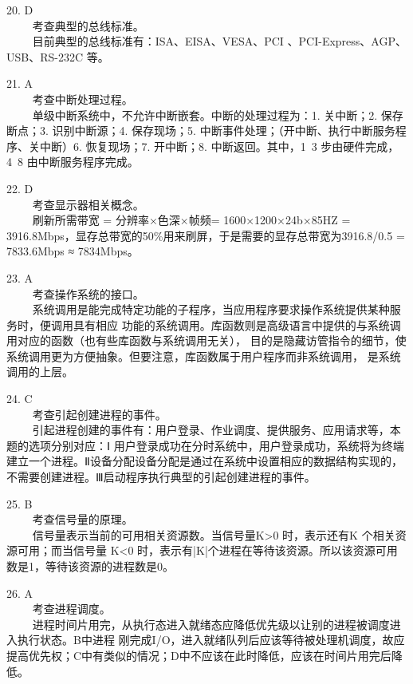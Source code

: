 20. D \\
$\qquad$ 考查典型的总线标准。 \\
$\qquad$ 目前典型的总线标准有：ISA、EISA、VESA、PCI 、PCI-Express、AGP、USB、RS-232C 等。

21. A \\
$\qquad$ 考查中断处理过程。\\
$\qquad$ 单级中断系统中，不允许中断嵌套。中断的处理过程为：1. 关中断；2. 保存断点；3. 识别中断源；4. 保存现场；5. 中断事件处理；（开中断、执行中断服务程序、关中断）6. 恢复现场；7. 开中断；8. 中断返回。其中，1~3 步由硬件完成，4~8 由中断服务程序完成。

22. D \\
$\qquad$ 考查显示器相关概念。\\
$\qquad$ 刷新所需带宽 = 分辨率×色深×帧频= 1600×1200×24b×85HZ = 3916.8Mbps，显存总带宽的50\%用来刷屏，于是需要的显存总带宽为3916.8/0.5 = 7833.6Mbps ≈ 7834Mbps。

23. A \\
$\qquad$ 考查操作系统的接口。\\
$\qquad$ 系统调用是能完成特定功能的子程序，当应用程序要求操作系统提供某种服务时，便调用具有相应
功能的系统调用。库函数则是高级语言中提供的与系统调用对应的函数（也有些库函数与系统调用无关），
目的是隐藏访管指令的细节，使系统调用更为方便抽象。但要注意，库函数属于用户程序而非系统调用，
是系统调用的上层。

24. C \\
$\qquad$ 考查引起创建进程的事件。\\
$\qquad$ 引起进程创建的事件有：用户登录、作业调度、提供服务、应用请求等，本题的选项分别对应：Ⅰ
用户登录成功在分时系统中，用户登录成功，系统将为终端建立一个进程。Ⅱ设备分配设备分配是通过在系统中设置相应的数据结构实现的，不需要创建进程。Ⅲ启动程序执行典型的引起创建进程的事件。

25. B \\
$\qquad$ 考查信号量的原理。\\
$\qquad$ 信号量表示当前的可用相关资源数。当信号量K>0 时，表示还有K 个相关资源可用；而当信号量
K<0 时，表示有|K|个进程在等待该资源。所以该资源可用数是1，等待该资源的进程数是0。

26. A \\
$\qquad$ 考查进程调度。\\
$\qquad$ 进程时间片用完，从执行态进入就绪态应降低优先级以让别的进程被调度进入执行状态。B中进程
刚完成I/O，进入就绪队列后应该等待被处理机调度，故应提高优先权；C中有类似的情况；D中不应该在此时降低，应该在时间片用完后降低。

